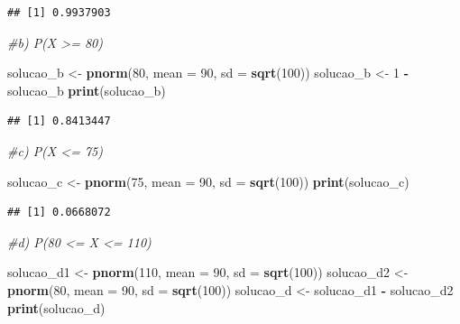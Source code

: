 \documentclass[
]{article}
\newenvironment{Shaded}{\begin{snugshade}}{\end{snugshade}}
\newcommand{\AttributeTok}[1]{\textcolor[rgb]{0.13,0.29,0.53}{#1}}
\newcommand{\CommentTok}[1]{\textcolor[rgb]{0.56,0.35,0.01}{\textit{#1}}}
\newcommand{\DecValTok}[1]{\textcolor[rgb]{0.00,0.00,0.81}{#1}}
\newcommand{\FunctionTok}[1]{\textcolor[rgb]{0.13,0.29,0.53}{\textbf{#1}}}
\newcommand{\NormalTok}[1]{#1}
\newcommand{\OtherTok}[1]{\textcolor[rgb]{0.56,0.35,0.01}{#1}}
\newcommand{\SpecialCharTok}[1]{\textcolor[rgb]{0.81,0.36,0.00}{\textbf{#1}}}
\begin{document}
\begin{verbatim}
## [1] 0.9937903
\end{verbatim}

\begin{Shaded}
\begin{Highlighting}[]
\CommentTok{\#b) P(X \textgreater{}= 80)}

\NormalTok{solucao\_b }\OtherTok{\textless{}{-}} \FunctionTok{pnorm}\NormalTok{(}\DecValTok{80}\NormalTok{, }\AttributeTok{mean =} \DecValTok{90}\NormalTok{, }\AttributeTok{sd =} \FunctionTok{sqrt}\NormalTok{(}\DecValTok{100}\NormalTok{))}
\NormalTok{solucao\_b }\OtherTok{\textless{}{-}} \DecValTok{1} \SpecialCharTok{{-}}\NormalTok{ solucao\_b}
\FunctionTok{print}\NormalTok{(solucao\_b)}
\end{Highlighting}
\end{Shaded}

\begin{verbatim}
## [1] 0.8413447
\end{verbatim}

\begin{Shaded}
\begin{Highlighting}[]
\CommentTok{\#c) P(X \textless{}= 75)}

\NormalTok{solucao\_c }\OtherTok{\textless{}{-}} \FunctionTok{pnorm}\NormalTok{(}\DecValTok{75}\NormalTok{, }\AttributeTok{mean =} \DecValTok{90}\NormalTok{, }\AttributeTok{sd =} \FunctionTok{sqrt}\NormalTok{(}\DecValTok{100}\NormalTok{))}
\FunctionTok{print}\NormalTok{(solucao\_c)}
\end{Highlighting}
\end{Shaded}

\begin{verbatim}
## [1] 0.0668072
\end{verbatim}

\begin{Shaded}
\begin{Highlighting}[]
\CommentTok{\#d) P(80 \textless{}= X \textless{}= 110) }

\NormalTok{solucao\_d1 }\OtherTok{\textless{}{-}} \FunctionTok{pnorm}\NormalTok{(}\DecValTok{110}\NormalTok{, }\AttributeTok{mean =} \DecValTok{90}\NormalTok{, }\AttributeTok{sd =} \FunctionTok{sqrt}\NormalTok{(}\DecValTok{100}\NormalTok{))}
\NormalTok{solucao\_d2 }\OtherTok{\textless{}{-}} \FunctionTok{pnorm}\NormalTok{(}\DecValTok{80}\NormalTok{, }\AttributeTok{mean =} \DecValTok{90}\NormalTok{, }\AttributeTok{sd =} \FunctionTok{sqrt}\NormalTok{(}\DecValTok{100}\NormalTok{))}
\NormalTok{solucao\_d }\OtherTok{\textless{}{-}}\NormalTok{ solucao\_d1 }\SpecialCharTok{{-}}\NormalTok{ solucao\_d2}
\FunctionTok{print}\NormalTok{(solucao\_d) }
\end{Highlighting}
\end{Shaded}
\end{document}
